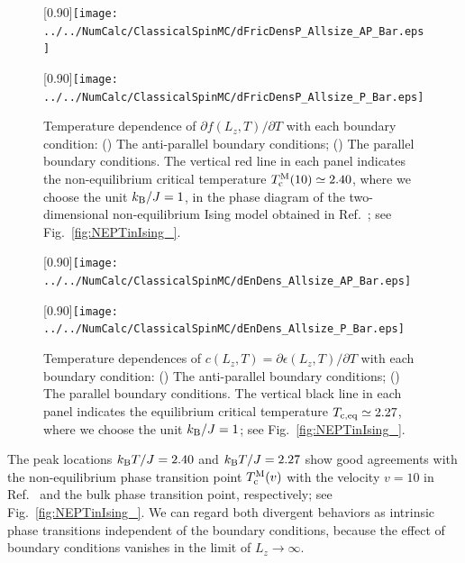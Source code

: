 \begin{figure}[htbp]
	\centering
	\subcaptionbox{\label{fig:dFricDens_Allsize_AP}}[0.90\linewidth]{\texttt{[image: ../../NumCalc/ClassicalSpinMC/dFricDensP\_Allsize\_AP\_Bar.eps]}}
	
	\subcaptionbox{\label{fig:dFricDens_Allsize_P}}[0.90\linewidth]{\texttt{[image: ../../NumCalc/ClassicalSpinMC/dFricDensP\_Allsize\_P\_Bar.eps]}}
	
	\caption{Temperature dependence of $\partial f(L_{z}, T)/\partial T$ with each boundary condition: () The anti-parallel boundary conditions; () The parallel boundary conditions. The vertical red line in each panel indicates the non-equilibrium critical temperature $T^{\rm M}_{\rm c}(10)\simeq 2.40$, where we choose the unit $k_{\rm B}/J=1$, in the phase diagram of the two-dimensional non-equilibrium Ising model obtained in Ref.~\cite{Hucht2009b}; see Fig.~\ref{fig:NEPTinIsing_}.}
	\label{fig:dFricDens_Allsize}
\end{figure}

\begin{figure}[htbp]
	\centering
	\subcaptionbox{\label{fig:dEnDens_Allsize_AP}}[0.90\linewidth]{\texttt{[image: ../../NumCalc/ClassicalSpinMC/dEnDens\_Allsize\_AP\_Bar.eps]}}
	
	\subcaptionbox{\label{fig:dEnDens_Allsize_P}}[0.90\linewidth]{\texttt{[image: ../../NumCalc/ClassicalSpinMC/dEnDens\_Allsize\_P\_Bar.eps]}}
	
	\caption{Temperature dependences of $c(L_{z}, T) = \partial \epsilon(L_{z}, T)/\partial T$ with each boundary condition: () The anti-parallel boundary conditions;  () The parallel boundary conditions. The vertical black line in each panel indicates the equilibrium critical temperature $T_{\rm c,eq}\simeq 2.27$, where we choose the unit $k_{\rm B}/J=1$; see Fig.~\ref{fig:NEPTinIsing_}.}
	\label{fig:dEnDens_Allsize}
\end{figure}

The peak locations $k_{\rm B}T/J=2.40$ and $k_{\rm B}T/J=2.27$ show good agreements with the non-equilibrium phase transition point $T_{\rm c}^{\rm M}(v)$ with the velocity $v=10$ in Ref.~\cite{Hucht2009b} and the bulk phase transition point, respectively; see Fig.~\ref{fig:NEPTinIsing_}. We can regard both divergent behaviors as intrinsic phase transitions independent of the boundary conditions, because the effect of boundary conditions vanishes in the limit of $L_{z}\to\infty$.

